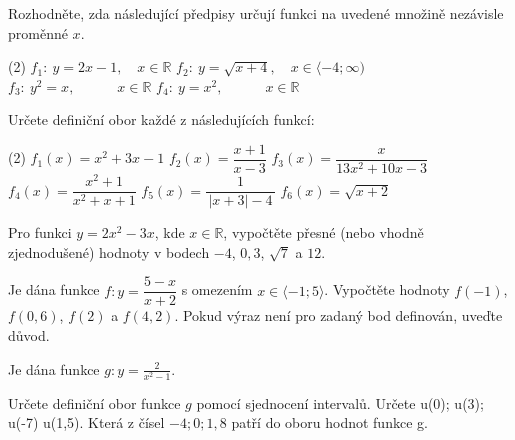 \documentclass[12pt,a4paper]{article}
\begin{document}
\begin{exercise}
    Rozhodněte, zda následující předpisy určují funkci na uvedené množině nezávisle proměnné \(x\).  

    \begin{tasks}(2)
        \task \(f_{1}:~ y = 2x - 1,\quad x \in \mathbb{R}\)
        \task \(f_{2}:~ y = \sqrt{x + 4},\quad x \in \langle -4; \infty )\)
        \task \(f_{3}:~ y^{2} = x,\quad \quad \quad x \in \mathbb{R}\)
        \task \(f_{4}:~ y = x^{2},\quad \quad \quad x \in \mathbb{R}\)
    \end{tasks}

\end{exercise}


\begin{exercise}
    Určete definiční obor každé z následujících funkcí:
    \begin{tasks}(2)
        \task \(f_{1}(x)=x^{2}+3x-1\)
        \task \(f_{2}(x)=\dfrac{x+1}{x-3}\)
        \task \(f_{3}(x)=\dfrac{x}{13x^{2}+10x-3}\)
        \task \(f_{4}(x)=\dfrac{x^{2}+1}{x^{2}+x+1}\)
        \task \(f_{5}(x)=\dfrac{1}{\,|x+3|-4\,}\)
        \task \(f_{6}(x)=\sqrt{x+2}\)
    \end{tasks}
\end{exercise}


\begin{exercise}
    Pro funkci \(y=2x^{2}-3x\), kde \(x\in\mathbb{R}\), vypočtěte přesné (nebo vhodně zjednodušené) hodnoty v bodech
    \(-4\), \(0{,}3\), \(\sqrt{7}\) a \(12\).
\end{exercise}


\begin{exercise}
    Je dána funkce \(f\colon y=\dfrac{5-x}{x+2}\) s omezením \(x\in\langle -1;5\rangle\). Vypočtěte hodnoty
    \(f(-1)\), \(f(0{,}6)\), \(f(2)\) a \(f(4{,}2)\). Pokud výraz není pro zadaný bod definován, uveďte důvod.
\end{exercise}


\begin{exercise}
    Je dána funkce $g:y=\frac{2}{x^2 - 1}$.
    \begin{tasks}
        \task Určete definiční obor funkce $g$ pomocí sjednocení intervalů.
        \task Určete u(0); u(3); u(-7) u(1,5).
        \task Která z čísel $-4;0;1,8$ patří do oboru hodnot funkce g.
    \end{tasks}
\end{exercise}
\end{document}
